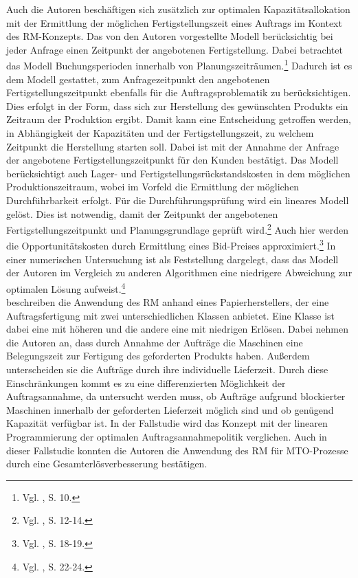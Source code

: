 Auch die Autoren \cite{guhlich2015revenue} beschäftigen sich zusätzlich zur optimalen Kapazitätsallokation mit der Ermittlung der möglichen Fertigstellungszeit eines Auftrags im Kontext des RM-Konzepts. Das von den Autoren vorgestellte Modell berücksichtig bei jeder Anfrage einen Zeitpunkt der angebotenen Fertigstellung. Dabei betrachtet das Modell Buchungsperioden innerhalb von Planungszeiträumen.\footnote{Vgl. \cite{guhlich2015revenue}, S. 10.} Dadurch ist es dem Modell gestattet, zum Anfragezeitpunkt den angebotenen Fertigstellungszeitpunkt ebenfalls für die Auftragsproblematik zu berücksichtigen. Dies erfolgt in der Form, dass sich zur Herstellung des gewünschten Produkts ein Zeitraum der Produktion ergibt. Damit kann eine Entscheidung getroffen werden, in Abhängigkeit der Kapazitäten und der Fertigstellungszeit, zu welchem Zeitpunkt die Herstellung starten soll. Dabei ist mit der Annahme der Anfrage der angebotene Fertigstellungszeitpunkt für den Kunden bestätigt. Das Modell berücksichtigt auch Lager- und Fertigstellungsrückstandskosten in dem möglichen Produktionszeitraum, wobei im Vorfeld die Ermittlung der möglichen Durchführbarkeit erfolgt. Für die Durchführungsprüfung wird ein lineares Modell gelöst. Dies ist notwendig, damit der Zeitpunkt der angebotenen Fertigstellungszeitpunkt und Planungsgrundlage geprüft wird.\footnote{Vgl. \cite{guhlich2015revenue}, S. 12-14.} Auch hier werden die Opportunitätskosten durch Ermittlung eines Bid-Preises approximiert.\footnote{Vgl. \cite{guhlich2015revenue}, S. 18-19.} In einer numerischen Untersuchung ist als Feststellung dargelegt, dass das Modell der Autoren im Vergleich zu anderen Algorithmen eine niedrigere Abweichung zur optimalen Lösung aufweist.\footnote{Vgl. \cite{guhlich2015revenue}, S. 22-24.}\\[.5cm]

\cite{kuhn2004revenue} beschreiben die Anwendung des RM anhand eines Papierherstellers, der eine Auftragsfertigung mit zwei unterschiedlichen Klassen anbietet. Eine Klasse ist dabei eine mit höheren und die andere eine mit niedrigen Erlösen. Dabei nehmen die Autoren an, dass durch Annahme der Aufträge die Maschinen eine Belegungszeit zur Fertigung des geforderten Produkts haben. Außerdem unterscheiden sie die Aufträge durch ihre individuelle Lieferzeit. Durch diese Einschränkungen kommt es zu eine differenzierten Möglichkeit der Auftragsannahme, da untersucht werden muss, ob Aufträge aufgrund blockierter Maschinen innerhalb der geforderten Lieferzeit möglich sind und ob genügend Kapazität verfügbar ist. In der Fallstudie wird das Konzept mit der linearen Programmierung der optimalen Auftragsannahmepolitik verglichen. Auch in dieser Fallstudie konnten die Autoren die Anwendung des RM für MTO-Prozesse durch eine Gesamterlösverbesserung bestätigen.


